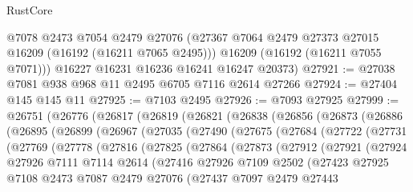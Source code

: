 \begin{lexlean}{RustCore}
\begin{coremodule}
        @7078
        @2473
        @7054
        @2479
        @27076
        (@27367 @7064 @2479 @27373 @27015 @16209 (@16192 (@16211 @7065 @2495)))
        @16209
        (@16192 (@16211 @7055 @7071)))
      @16227
      @16231
      @16236
      @16241
      @16247
      @20373)
@27921 := @27038 @7081 @938 @968 @11 @2495 @6705 @7116 @2614 @27266
@27924 := @27404 @145 @145 @11
@27925 := @7103 @2495
@27926 := @7093 @27925
@27999 := @26751
    (@26776
      (@26817
        (@26819
          (@26821
            (@26838
              (@26856
                (@26873
                  (@26886
                    (@26895
                      (@26899
                        (@26967
                          (@27035
                            (@27490
                              (@27675
                                (@27684
                                  (@27722
                                    (@27731
                                      (@27769
                                        (@27778
                                          (@27816
                                            (@27825
                                              (@27864
                                                (@27873
                                                  (@27912
                                                    (@27921
                                                      (@27924
                                                        @27926
                                                        @7111
                                                        @7114
                                                        @2614
                                                        (@27416
                                                          @27926
                                                          @7109
                                                          @2502
                                                          (@27423
                                                            @27925
                                                            @7108
                                                            @2473
                                                            @7087
                                                            @2479
                                                            @27076
                                                            (@27437
                                                              @7097
                                                              @2479
                                                              @27443

\end{coremodule}
\end{lexlean}
